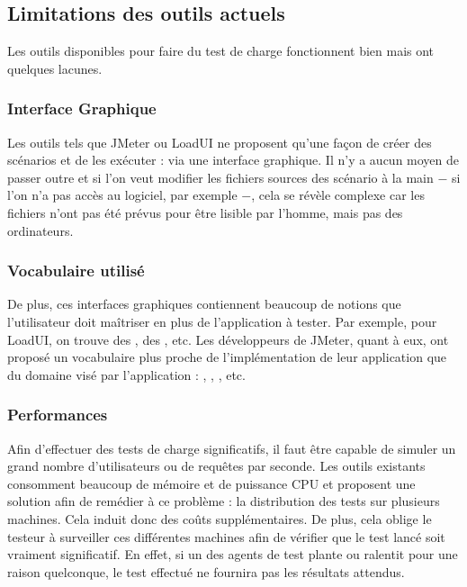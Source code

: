 \subsection{Limitations des outils actuels}
Les outils disponibles pour faire du test de charge fonctionnent bien mais ont quelques lacunes.
\subsubsection{Interface Graphique}
Les outils tels que JMeter ou LoadUI ne proposent qu'une façon de créer des scénarios et de les exécuter : via une interface graphique. Il n'y a aucun moyen de passer outre et si l'on veut modifier les fichiers sources des scénario à la main $-$ si l'on n'a pas accès au logiciel, par exemple $-$, cela se révèle complexe car les fichiers n'ont pas été prévus pour être lisible par l'homme, mais pas des ordinateurs.

\subsubsection{Vocabulaire utilisé}
De plus, ces interfaces graphiques contiennent beaucoup de notions que l'utilisateur doit maîtriser en plus de l'application à tester. Par exemple, pour LoadUI, on trouve des , des , etc. Les développeurs de JMeter, quant à eux, ont proposé un vocabulaire plus proche de l'implémentation de leur application que du domaine visé par l'application : , , , etc.

\subsubsection{Performances}
\label{pb_perfs}
Afin d'effectuer des tests de charge significatifs, il faut être capable de simuler un grand nombre d'utilisateurs ou de requêtes par seconde. Les outils existants consomment beaucoup de mémoire et de puissance CPU et proposent une solution afin de remédier à ce problème : la distribution des tests sur plusieurs machines. Cela induit donc des coûts supplémentaires. De plus, cela oblige le testeur à surveiller ces différentes machines afin de vérifier que le test lancé soit vraiment significatif. En effet, si un des agents de test plante ou ralentit pour une raison quelconque, le test effectué ne fournira pas les résultats attendus.

